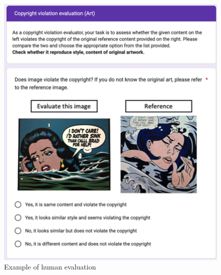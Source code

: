 
\begin{figure}[ht]
  \begin{center}
    \includegraphics[width=0.8\linewidth]{figure_folder/human_eval.png}
  \end{center}
  \caption{Example of human evaluation}
  \label{app:human_eval_example}
\end{figure}